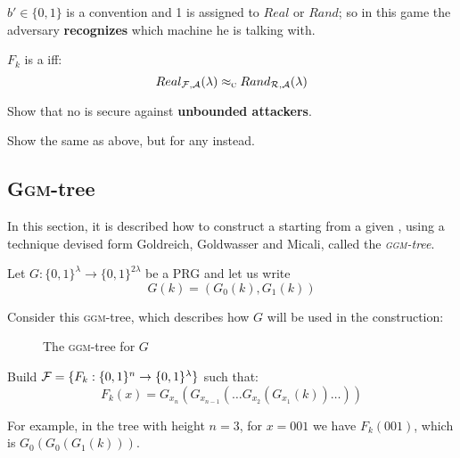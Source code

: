 $b' \in \{0,1\}$ is a convention and 1 is assigned to $Real$ or $Rand$; so in this game the adversary \textbf{recognizes} which machine he is talking with.

\begin{definition}
    $F_k$ is a \prf{} iff: 
    \[
        Real_{\mathcal{F}, \mathcal{A}}(\lambda) \approx_\textsc{c} Rand_{\mathcal{R}, \mathcal{A}}(\lambda)
    \]
\end{definition}

\begin{exercise}
    Show that no \prg{} is secure against \textbf{unbounded attackers}.
\end{exercise}

\begin{exercise}
    Show the same as above, but for any \prf{} instead.
\end{exercise}

\subsection{\textsc{Ggm}-tree}

In this section, it is described how to construct a \prf{} starting from a given \prg, using a technique devised form Goldreich, Goldwasser and Micali, called the \emph{\textsc{ggm}-tree}.

\begin{construction}
    Let $G : \{0,1\}^{\lambda} \to \{0,1\}^{2\lambda} $ be a PRG and let us write 
    \[
        G(k)=(G_{0}(k), G_{1}(k))
    \]

    Consider this \textsc{ggm}-tree, which describes how $G$ will be used in the \prf{} construction:

    \begin{figure}[htbp]
        \centering
        \caption{The \textsc{ggm}-tree for $G$}
        \label{fig:ggmtree}
    \end{figure}


    Build $\mathcal{F}=\{F_{k} : \{0,1\}^{n} \to \{0,1\}^{\lambda} \}$ such that:
    \[
        F_k(x)=G_{x_{n}}(G_{x_{n-1}}( \dots G_{x_2}(G_{x_1}(k)) \dots ))
    \]

\end{construction}

For example, in the tree with height $n=3$,  for $x=001$ we have $F_{k}(001)$, which is
$G_{0}(G_{0}(G_{1}(k)))$.

